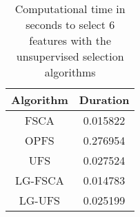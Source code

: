 \begin{table}
	\begin{center}
		\begin{tabular}{c c}
			Algorithm & Duration \\
			\hline
			FSCA & 0.015822 \\
			OPFS & 0.276954 \\
			UFS & 0.027524 \\
			LG-FSCA & 0.014783 \\
			LG-UFS & 0.025199 \\
		\end{tabular}
	\end{center}
	\caption{Computational time in seconds to select 6 features with the unsupervised selection algorithms}
\end{table}